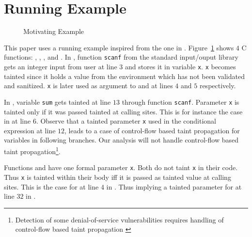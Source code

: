 \section{Running Example}\label{sec:example} 

\begin{figure}[!ht]
\centering
{}
\caption{Motivating Example}
\label{fig:sample}
\end{figure}

This paper uses a running example inspired from
the one in \cite{Dimitru:2009:STAC}.
Figure~\ref{fig:sample} shows $4$ C functions:
\main{}, \compute{}, \odd{}, and \even{}.
In \main{}, function \texttt{scanf} from the standard input/ouput
library gets an integer input from user at line $3$
and stores it in variable \texttt{x}. \texttt{x} 
becomes tainted since it holds a value from
the environment which has not been validated and
sanitized.
\texttt{x} is later used as argument to \even{} and \odd{}
at lines $4$ and $5$ respectively.

In \compute{}, variable \texttt{sum} gets tainted at
line $13$ through function \texttt{scanf}. Parameter
\texttt{x} is tainted only if it was passed tainted
at calling sites.
This is for instance the case in \main{} at line $6$.
Observe that a tainted parameter \texttt{x} used in
the conditional expression at line $12$, leads to
a case of control-flow based taint propagation for
variables in following branches.
Our analysis will not handle control-flow based taint
propagation\footnote{Detection of some denial-of-service
vulnerabilities requires handling of control-flow based
taint propagation \cite{Chang:2009:ICS}}. 

Functions \even{} and \odd{} have one formal parameter
\texttt{x}. Both do not taint \texttt{x} in their code.
Thus \texttt{x} is tainted within their body iff it is
passed as tainted value at calling sites. This is the case
for \even{} at line $4$ in \main{}. Thus implying a tainted
parameter for \odd{} at line $32$ in \even{}.